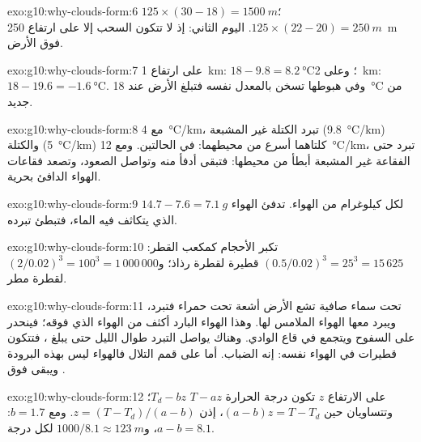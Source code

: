 \begin{solution}{exo:g10:why-clouds-form:6}
$125 \times (30 - 18) = \qty{1500}{m}$؛ $125 \times (22 - 20) =
\qty{250}{m}$. اليوم الثاني: إذ لا تتكون السحب إلا على ارتفاع \qty{250}{m} فوق
الأرض.
\end{solution}

\begin{solution}{exo:g10:why-clouds-form:7}
على ارتفاع \qty{1}{km}: $18 - 9.8 = \qty{8.2}{\degreeCelsius}$؛ وعلى \qty{2}{km}:
$18 - 19.6 = \qty{-1.6}{\degreeCelsius}$. وفي هبوطها تسخن بالمعدل نفسه فتبلغ
الأرض عند \qty{18}{\degreeCelsius} من جديد.
\end{solution}

\begin{solution}{exo:g10:why-clouds-form:8}
مع \qty{4}{\degreeCelsius/km}، تبرد الكتلة غير المشبعة
(\qty{9.8}{\degreeCelsius/km}) والكتلة 
(\qty{5}{\degreeCelsius/km}) كلتاهما أسرع من محيطهما:  في
الحالتين. ومع \qty{12}{\degreeCelsius/km}، تبرد حتى الفقاعة غير المشبعة أبطأ من
محيطها: فتبقى أدفأ منه وتواصل الصعود، وتصعد فقاعات الهواء الدافئ بحرية.
\end{solution}

\begin{solution}{exo:g10:why-clouds-form:9}
$14.7 - 7.6 = \qty{7.1}{g}$ لكل كيلوغرام من الهواء.  تدفئ
الهواء الذي يتكاثف فيه الماء، فتبطئ تبرده.
\end{solution}

\begin{solution}{exo:g10:why-clouds-form:10}
تكبر الأحجام كمكعب القطر: $(0.5/0.02)^3 = 25^3 = 15\,625$
قطيرة لقطرة رذاذ؛ و$(2/0.02)^3 = 100^3 = 1\,000\,000$ لقطرة
مطر.
\end{solution}

\begin{solution}{exo:g10:why-clouds-form:11}
تحت سماء صافية تشع الأرض أشعة تحت حمراء فتبرد، ويبرد معها الهواء الملامس لها.
وهذا الهواء البارد أكثف من الهواء الذي فوقه؛ فينحدر على السفوح ويتجمع في قاع
الوادي. وهناك يواصل التبرد طوال الليل حتى يبلغ ، فتتكون قطيرات في الهواء
نفسه: إنه الضباب. أما على قمم التلال فالهواء ليس بهذه البرودة ويبقى فوق .
\end{solution}

\begin{solution}{exo:g10:why-clouds-form:12}
على الارتفاع $z$ تكون درجة الحرارة $T - a z$  $T_d - b z$؛
وتتساويان حين $(a - b) z = T - T_d$، إذن $z = (T - T_d)/(a - b)$. ومع
$b = 1.7$: $a - b = 8.1$، و$1000/8.1 \approx \qty{123}{m}$ لكل درجة.
\end{solution}

